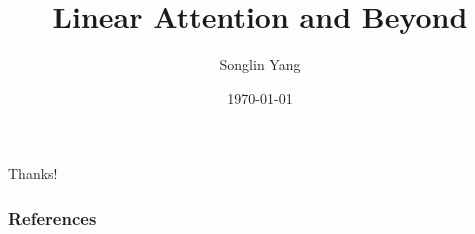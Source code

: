 \documentclass{beamer}
\title{Linear Attention and Beyond}
\author{Songlin Yang}
\institute{MIT CSAIL}
\date{\today}
\begin{document}






\begin{frame}{}
\begin{center}
\LARGE Thanks!
\end{center}
\end{frame}
\begin{frame}[allowframebreaks]
        \frametitle{References}
        \printbibliography
\end{frame}
\end{document}
